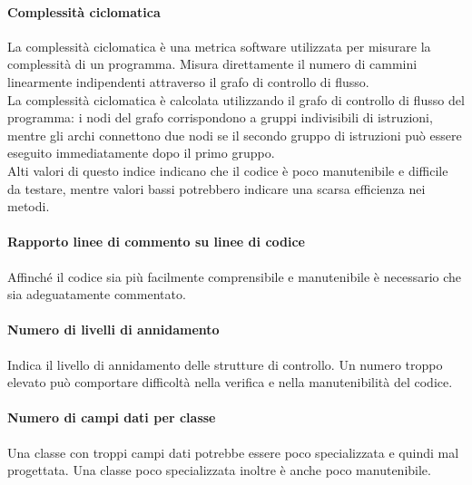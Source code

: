 \documentclass[12pt,a4paper,titlepage]{article}
\begin{document}
			\paragraph{Complessità ciclomatica}
			La complessità ciclomatica è una metrica software utilizzata per misurare la complessità di un programma. Misura direttamente il numero di cammini linearmente indipendenti attraverso il grafo di controllo di flusso.\\
			La complessità ciclomatica è calcolata utilizzando il grafo di controllo di flusso del programma: i nodi del grafo corrispondono a gruppi indivisibili di istruzioni, mentre gli archi connettono due nodi se il secondo gruppo di istruzioni può essere eseguito immediatamente dopo il primo gruppo.\\
			Alti valori di questo indice indicano che il codice è poco manutenibile e difficile da testare, mentre valori bassi potrebbero indicare una scarsa efficienza nei metodi.\\
	
			\paragraph{Rapporto linee di commento su linee di codice}
			Affinché il codice sia più facilmente comprensibile e manutenibile è necessario che sia adeguatamente commentato.\\
		
			\paragraph{Numero di livelli di annidamento}
			Indica il livello di annidamento delle strutture di controllo. Un numero troppo elevato può comportare difficoltà nella verifica e nella manutenibilità del codice.\\
		
			\paragraph{Numero di campi dati per classe}
			Una classe con troppi campi dati potrebbe essere poco specializzata e quindi mal progettata. Una classe poco specializzata inoltre è anche poco manutenibile.\\
		
\end{document}
